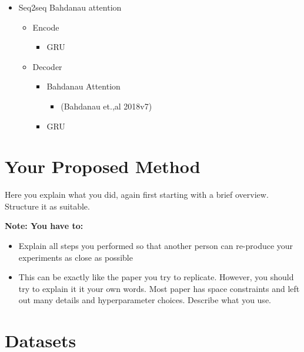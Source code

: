 \documentclass{article}
\begin{document}
\begin{itemize}
\item Seq2seq Bahdanau attention				
\begin{itemize}
\item Encode
\begin{itemize}
\item GRU
\end{itemize}
\end{itemize}
\begin{itemize}
\item Decoder
\begin{itemize}
\item Bahdanau Attention 
\begin{itemize}
\item(Bahdanau et.,al 2018v7)
\end{itemize}
\end{itemize}
\begin{itemize}
\item GRU
\end{itemize}
\end{itemize}
\end{itemize}



\section{Your Proposed Method}\label{sec:yourmethod}

Here you explain what you did, again first starting with a brief overview.
Structure it as suitable. 

{\bf Note: You have to:}
\begin{itemize}
\item Explain all steps you performed so that another person can re-produce your experiments as close as possible
\item This can be exactly like the paper you try to replicate. However, you should try to explain it it your own words. Most paper has space constraints and left out many details and hyperparameter choices. Describe what you use.
\end{itemize}



\section{Datasets} \label{sec:data}
\end{document}

